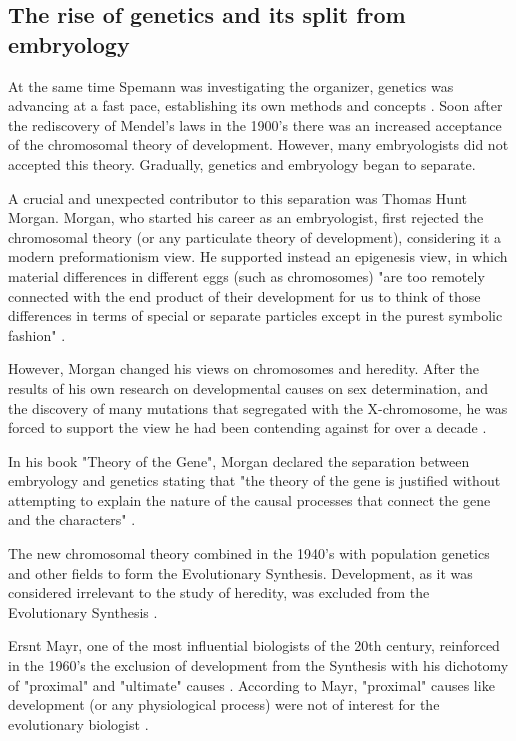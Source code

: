 \subsection{The rise of genetics and its split from embryology}

At the same time Spemann was investigating the organizer, genetics was advancing at a fast pace, establishing its own methods and concepts \citep{gilbert1991conceptual,Horder2001}.
Soon after the rediscovery of Mendel's laws in the 1900's there was an increased acceptance of the chromosomal theory of development. However, many embryologists did not accepted this theory.
Gradually, genetics and embryology began to separate.

A crucial and unexpected contributor to this separation was Thomas Hunt Morgan.
Morgan, who started his career as an embryologist, 
first rejected the chromosomal theory (or any particulate theory of development), considering it a modern preformationism view. 
He supported instead an epigenesis view, in which material differences in different eggs (such as chromosomes) "are too remotely connected with the end product of their development for us to think of those differences in terms of special or separate particles except in the purest symbolic fashion" \citep{Morgan1910}.

However, Morgan changed his views on chromosomes and heredity. After the results of his own research on developmental causes on sex determination, and the discovery of many mutations that segregated with the X-chromosome, he was forced to support the view he had been contending against for over a decade \citep{Gilbert1978}.

In his book "Theory of the Gene", Morgan declared the separation between embryology and genetics stating that "the theory of the gene is justified without attempting to explain the nature of the causal processes that connect the gene and the characters" \citep{Morgan1926}.

The new chromosomal theory
combined in the 1940's with population genetics and other fields to form the Evolutionary Synthesis. Development, as it was considered irrelevant to the study of heredity, was excluded from the Evolutionary Synthesis \citep{amundson2005changing}. 

Ersnt Mayr, one of the most influential biologists of the 20th century, reinforced in the 1960's the exclusion of development from the Synthesis with his dichotomy of "proximal" and "ultimate" causes \citep{Mayr1961}.
According to Mayr, "proximal" causes like development (or any physiological process) were not of interest for the evolutionary biologist \citep{Mayr1961,Mayr1993}.


